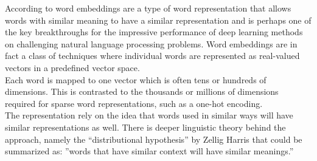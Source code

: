 ﻿\documentclass[conference]{IEEEtran}
\begin{document}
According to \cite{embeddings} word embeddings are a type of word representation that allows words with similar meaning to have a similar representation and is perhaps one of the key breakthroughs for the impressive performance of deep learning methods on challenging natural language processing problems.
Word embeddings are in fact a class of techniques where individual words are represented as real-valued vectors in a predefined vector space. \\
Each word is mapped to one vector which is often  tens or hundreds of dimensions. This is contrasted to the thousands or millions of dimensions required for sparse word representations, such as a one-hot encoding.\\
The representation rely on the idea that words used in similar ways will have similar representations as well. There is deeper linguistic theory behind the approach, namely the “distributional hypothesis” by Zellig Harris that could be summarized as: ''words that have similar context will have similar meanings.''
\end{document}
